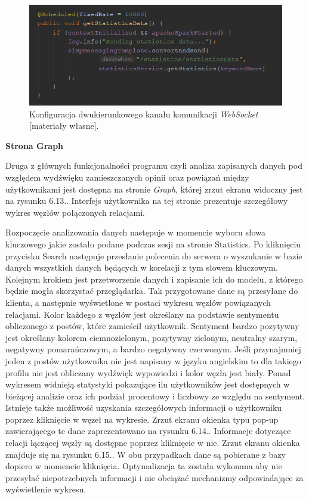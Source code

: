 \begin{figure}[h] %
	\centering
	\includegraphics[width=1.0\linewidth]{img/twitter_analyser_websocket_configuration_1}
	\caption{Konfiguracja dwukierunkowego kanału komunikacji \textit{WebSocket} [materiały własne].}
\end{figure}

\textbf{Strona Graph}

Druga z głównych funkcjonalności programu czyli analiza zapisanych danych pod względem wydźwięku zamieszczanych opinii oraz powiązań między użytkownikami jest dostępna na stronie \textit{Graph}, której zrzut ekranu widoczny jest na rysunku 6.13.. Interfejs użytkownika na tej stronie prezentuje szczegółowy wykres węzłów połączonych relacjami. 

Rozpoczęcie analizowania danych następuje w momencie wyboru słowa kluczowego jakie zostało podane podczas sesji na stronie Statistics. Po kliknięciu przycisku Search następuje przesłanie polecenia do serwera o wyszukanie w bazie danych wszystkich danych będących w korelacji z tym słowem kluczowym. Kolejnym krokiem jest przetworzenie danych i zapisanie ich do modelu, z którego będzie mogła skorzystać przeglądarka. Tak przygotowane dane są przesyłane do klienta, a następnie wyświetlone w postaci wykresu węzłów powiązanych relacjami. Kolor każdego z węzłów jest określany na podstawie sentymentu obliczonego z postów, które zamieścił użytkownik. Sentyment bardzo pozytywny jest określany kolorem ciemnozielonym, pozytywny zielonym, neutralny szarym, negatywny pomarańczowym, a bardzo negatywny czerwonym. Jeśli przynajmniej jeden z postów użytkownika nie jest napisany w języku angielskim to dla takiego profilu nie jest obliczany wydźwięk wypowiedzi i kolor węzła jest biały. Ponad wykresem widnieją statystyki pokazujące ilu użytkowników jest dostępnych w bieżącej analizie oraz ich podział procentowy i liczbowy ze względu na sentyment. Istnieje także możliwość uzyskania szczegółowych informacji o użytkowniku poprzez kliknięcie w węzeł na wykresie. Zrzut ekranu okienka typu pop-up zawierającego te dane zaprezentowano na rysunku 6.14.. Informacje dotyczące relacji łączącej węzły są dostępne poprzez kliknięcie w nie. Zrzut ekranu okienka znajduje się na rysunku 6.15.. W obu przypadkach dane są pobierane z bazy dopiero w momencie kliknięcia. Optymalizacja ta została wykonana aby nie przesyłać niepotrzebnych informacji i nie obciążać mechanizmy odpowiadające za wyświetlenie wykresu.

